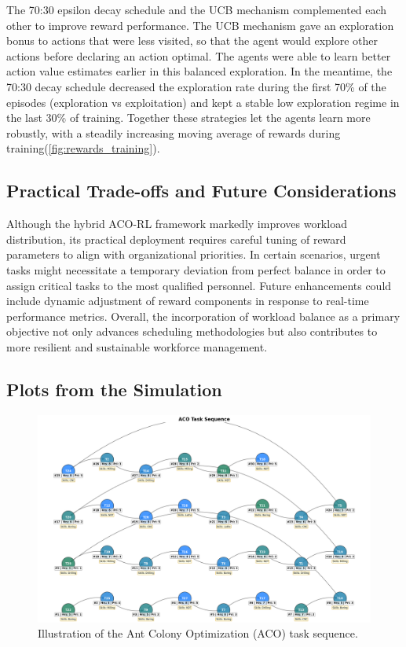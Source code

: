 \documentclass[%
aip,
cp,  %
reprint
]{revtex4-2}
\begin{document}
	The 70:30 epsilon decay schedule and the UCB mechanism complemented each other to improve reward performance. The UCB mechanism gave an exploration bonus to actions that were less visited, so that the agent would explore other actions before declaring an action optimal. The agents were able to learn better action value estimates earlier in this balanced exploration. In the meantime, the 70:30 decay schedule decreased the exploration rate during the first 70\% of the episodes (exploration vs exploitation) and kept a stable low exploration regime in the last 30\% of training. Together these strategies let the agents learn more robustly, with a steadily increasing moving average of rewards during training(\cref{fig:rewards_training}).
	
	\subsection{\label{subsec:tradeoffs}Practical Trade-offs and Future Considerations}
	Although the hybrid ACO-RL framework markedly improves workload distribution,
	its practical deployment requires careful tuning of reward parameters to align
	with organizational priorities. In certain scenarios, urgent tasks might
	necessitate a temporary deviation from perfect balance in order to assign
	critical tasks to the most qualified personnel. Future enhancements could include
	dynamic adjustment of reward components in response to real-time performance metrics.
	Overall, the incorporation of workload balance as a primary objective not only
	advances scheduling methodologies but also contributes to more resilient and sustainable
	workforce management.
	
	
	\subsection{\label{subsec:plots}Plots from the Simulation}
	
	\begin{figure}[H]
		\centering
		\includegraphics[width=1\textwidth]{figures/aco_network.png}
		\caption{\label{fig:aco_sequence}Illustration of the Ant Colony Optimization (ACO) task sequence.}
	\end{figure}
	
\end{document}
